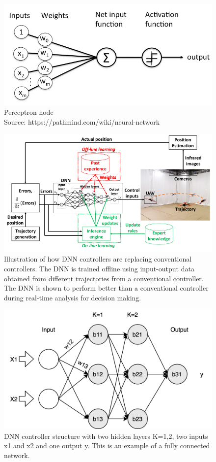 \begin{figure}
	\centering
	\includegraphics[width=0.7\linewidth]{Images/perceptron_node}
	\caption{Perceptron node  \\ Source: https://pathmind.com/wiki/neural-network}
	\label{fig:perceptronnode}
\end{figure}

\begin{figure}
	\centering
	\includegraphics[width=0.7\linewidth]{Images/DNNcontroller}
	\caption{Illustration of how DNN controllers are replacing conventional controllers. The DNN is trained offline using input-output data obtained from different trajectories from a conventional controller. The DNN is shown to perform better than a conventional controller during real-time analysis for decision making.}
	\label{fig:dnncontroller}
\end{figure}

\begin{figure}
	\centering
	\includegraphics[width=0.7\linewidth]{Images/DNNstructure}
	\caption[DNN structure]{DNN controller structure with two hidden layers K=1,2, two inputs x1 and x2 and one output y. This is an example of a fully connected network.}
	\label{fig:dnn-controller}
\end{figure}

